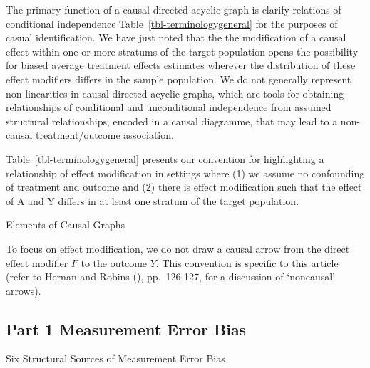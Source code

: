 \documentclass[
  single column]{article}
\begin{document}
The primary function of a causal directed acyclic graph is clarify
relations of conditional independence Table~\ref{tbl-terminologygeneral}
for the purposes of casual identification. We have just noted that the
the modification of a causal effect within one or more stratums of the
target population opens the possibility for biased average treatment
effects estimates wherever the distribution of these effect modifiers
differs in the sample population. We do not generally represent
non-linearities in causal directed acyclic graphs, which are tools for
obtaining relationships of conditional and unconditional independence
from assumed structural relationships, encoded in a causal diagramme,
that may lead to a non-causal treatment/outcome association.

Table~\ref{tbl-terminologygeneral} presents our convention for
highlighting a relationship of effect modification in settings where (1)
we assume no confounding of treatment and outcome and (2) there is
effect modification such that the effect of A and Y differs in at least
one stratum of the target population.

\begin{table}

\caption{\label{tbl-terminologygeneral}Elements of Causal Graphs}

\centering{

\terminologyeffectmodification

}

\end{table}%

To focus on effect modification, we do not draw a causal arrow from the
direct effect modifier \(F\) to the outcome \(Y\). This convention is
specific to this article (refer to Hernan and Robins
(), pp.~126-127, for a discussion
of `noncausal' arrows).

\subsection{Part 1 Measurement Error
Bias}\label{part-1-measurement-error-bias}

\begin{table}

\caption{\label{tbl-terminologymeasurementerror}Six Structural Sources
of Measurement Error Bias}

\centering{

\terminologymeasurementerror

}

\end{table}%
\end{document}
